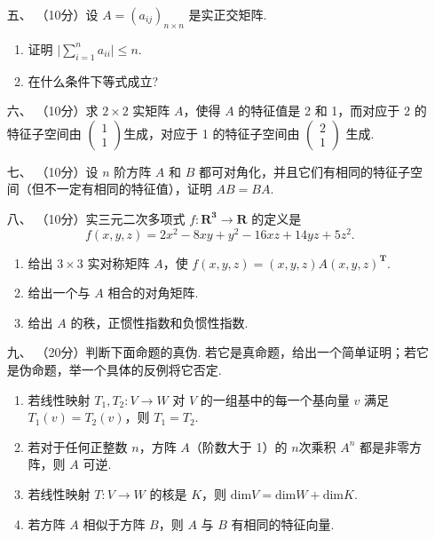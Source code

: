 \begin{enumerate}
    \item [五、]（10分）设 $A=(a_{ij})_{n\times n}$ 是实正交矩阵.
    \begin{enumerate}[label=(\arabic*)]
        \item 证明 $\lvert\sum\limits_{i=1}^n{a_{ii}}\rvert \leq n$.

        \item 在什么条件下等式成立?
    \end{enumerate}

\item [六、]（10分）求 $2\times 2$ 实矩阵 $A$，使得 $A$ 的特征值是 2 和 1，而对应于 2 的特征子空间由 $\begin{pmatrix}1 \\ 1\end{pmatrix}$生成，对应于 1 的特征子空间由 $\begin{pmatrix}2 \\ 1\end{pmatrix}$ 生成.

    \item [七、]（10分）设 $n$ 阶方阵 $A$ 和 $B$ 都可对角化，并且它们有相同的特征子空间（但不一定有相同的特征值），证明 $AB=BA$.

    \item [八、]（10分）实三元二次多项式 $f:\mathbf{R^3}\to \mathbf{R}$ 的定义是
    \[f(x,y,z) = 2x^2-8xy+y^2-16xz+14yz+5z^2.\]
    \begin{enumerate}[label=(\arabic*)]
        \item 给出 $3\times 3$ 实对称矩阵 $A$，使 $f(x,y,z) = (x,y,z)A(x,y,z)^{\mathbf{T}}$.

        \item 给出一个与 $A$ 相合的对角矩阵.

        \item 给出 $A$ 的秩，正惯性指数和负惯性指数.
    \end{enumerate}

\item [九、]（20分）判断下面命题的真伪. 若它是真命题，给出一个简单证明；若它是伪命题，举一个具体的反例将它否定.
    \begin{enumerate}[label=(\arabic*)]
        \item 若线性映射 $T_1,T_2:V \to W$ 对 $V$ 的一组基中的每一个基向量 $v$ 满足 $T_1(v)=T_2(v)$，则 $T_1=T_2$.

        \item 若对于任何正整数 $n$，方阵 $A$（阶数大于 1）的 $n$次乘积 $A^n$ 都是非零方阵，则 $A$ 可逆.

        \item 若线性映射 $T:V\to W$ 的核是 $K$，则 $\mathrm{dim}V=\mathrm{dim}W+\mathrm{dim}K$.

        \item 若方阵 $A$ 相似于方阵 $B$，则 $A$ 与 $B$ 有相同的特征向量.
    \end{enumerate}
\end{enumerate}

\clearpage
